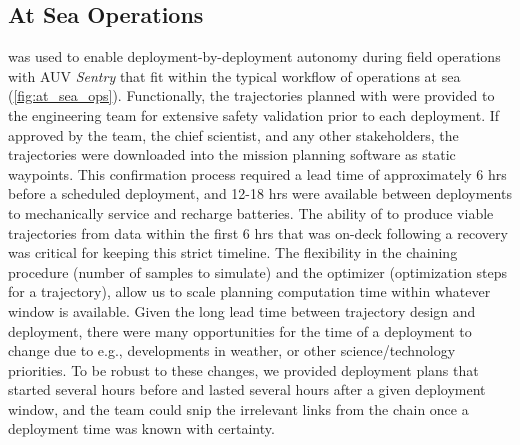 \subsection{At Sea Operations}
\PHORTEX was used to enable deployment-by-deployment autonomy during field operations with AUV \emph{Sentry} that fit within the typical workflow of operations at sea (\cref{fig:at_sea_ops}). Functionally, the trajectories planned with \PHORTEX were provided to the \Sentry engineering team for extensive safety validation prior to each deployment. If approved by the \Sentry team, the chief scientist, and any other stakeholders, the trajectories were downloaded into the \Sentry mission planning software as static waypoints. This confirmation process required a lead time of approximately 6 hrs before a scheduled deployment, and 12-18 hrs were available between deployments to mechanically service \Sentry and recharge batteries. The ability of \PHORTEX to produce viable trajectories from data within the first 6 hrs that \Sentry was on-deck following a recovery was critical for keeping this strict timeline. The flexibility in the \PHUMES chaining procedure (number of samples to simulate) and the \PHORTEX optimizer (optimization steps for a trajectory), allow us to scale planning computation time within whatever window is available. Given the long lead time between trajectory design and \Sentry deployment, there were many opportunities for the time of a deployment to change due to e.g., developments in weather, or other science/technology priorities. To be robust to these changes, we provided deployment plans that started several hours before and lasted several hours after a given deployment window, and the \Sentry team could snip the irrelevant links from the chain once a deployment time was known with certainty.

